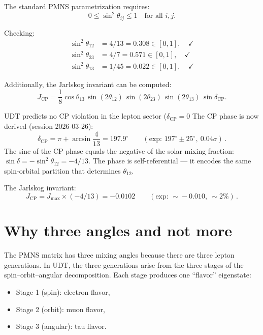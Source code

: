 \documentclass[11pt,letterpaper]{article}
\numberwithin{equation}{section}
\begin{document}
The standard PMNS parametrization requires:
\begin{equation}
  0 \leq \sin^2\theta_{ij} \leq 1 \quad \text{for all } i,j.
\end{equation}

Checking:
\begin{align}
  \sin^2\theta_{12} &= 4/13 = 0.308 \in [0,1], \quad \checkmark \\
  \sin^2\theta_{23} &= 4/7 = 0.571 \in [0,1], \quad \checkmark \\
  \sin^2\theta_{13} &= 1/45 = 0.022 \in [0,1], \quad \checkmark
\end{align}

Additionally, the Jarlskog invariant can be computed:
\begin{equation}
  J_\mathrm{CP} = \frac{1}{8}\cos\theta_{13}\,\sin(2\theta_{12})\,
  \sin(2\theta_{23})\,\sin(2\theta_{13})\,\sin\delta_\mathrm{CP}.
\end{equation}

UDT predicts no CP violation in the lepton sector ($\delta_\mathrm{CP} = 0$
The CP phase is now derived (session 2026-03-26):
\begin{equation}
  \delta_\mathrm{CP} = \pi + \arcsin\!\frac{4}{13}
  = 197.9^\circ
  \qquad(\text{exp: }197^\circ \pm 25^\circ,\ 0.04\sigma)\,.
\end{equation}
The sine of the CP phase equals the negative of the solar mixing
fraction: $\sin\delta = -\sin^2\theta_{12} = -4/13$.  The phase is
self-referential --- it encodes the same spin-orbital partition that
determines $\theta_{12}$.

The Jarlskog invariant:
\begin{equation}
  J_\mathrm{CP} = J_\mathrm{max} \times (-4/13) = -0.0102
  \qquad(\text{exp: }\sim\!{-}0.010,\ {\sim}2\%)\,.
\end{equation}

\section{Why three angles and not more}
\label{sec:three_angles}

The PMNS matrix has three mixing angles because there are three lepton
generations. In UDT, the three generations arise from the three stages
of the spin--orbit--angular decomposition. Each stage produces one
``flavor'' eigenstate:
\begin{itemize}
  \item Stage 1 (spin): electron flavor,
  \item Stage 2 (orbit): muon flavor,
  \item Stage 3 (angular): tau flavor.
\end{itemize}
\end{document}
